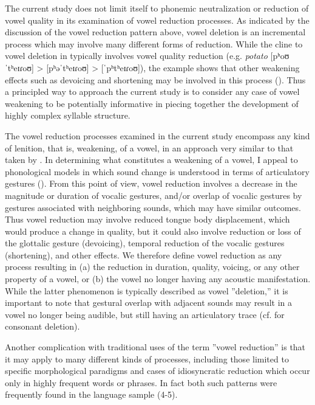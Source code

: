   The current study does not limit itself to phonemic neutralization or reduction of vowel quality in its examination of vowel reduction processes. As indicated by the discussion of the  vowel reduction pattern above, vowel deletion is an incremental process which may involve many different forms of reduction. While the cline to vowel deletion in  typically involves vowel quality reduction (e.g. \textit{potato} [pʰoʊˈtʰeɪɾoʊ] > [pʰəˈtʰeɪɾoʊ] > [ˈpʰtʰeɪɾoʊ]), the  example shows that other weakening effects such as devoicing and shortening may be involved in this process (\citealt{ChitoranBabaliyeva2007}). Thus a principled way to approach the current study is to consider any case of vowel weakening to be potentially informative in piecing together the development of highly complex syllable structure.

  The vowel reduction processes examined in the current study encompass any kind of lenition, that is, weakening, of a vowel, in an approach very similar to that taken by \citet{KapatsinskiEtAl2019}. In determining what constitutes a weakening of a vowel, I appeal to phonological models in which sound change is understood in terms of articulatory gestures (\citealt{BrowmanGoldstein1992b,MowreyPagliuca1995}). From this point of view, vowel reduction involves a decrease in the magnitude or duration of vocalic gestures, and/or overlap of vocalic gestures by gestures associated with neighboring sounds, which may have similar outcomes. Thus vowel reduction may involve reduced tongue body displacement, which would produce a change in quality, but it could also involve reduction or loss of the glottalic gesture (devoicing), temporal reduction of the vocalic gestures (shortening), and other effects. We therefore define vowel reduction as any process resulting in 
  (a) the reduction in duration, quality, voicing, or any other property of a vowel, or 
  (b) the vowel no longer having any acoustic manifestation. While the latter phenomenon is typically described as vowel ”deletion,” it is important to note that gestural overlap with adjacent sounds may result in a vowel no longer being audible, but still having an articulatory trace (cf. \citealt{BrowmanGoldstein1990} for consonant deletion).

  Another complication with traditional uses of the term ”vowel reduction” is that it may apply to many different kinds of processes, including those limited to specific morphological paradigms and cases of idiosyncratic reduction which occur only in highly frequent words or phrases. In fact both such patterns were frequently found in the language sample (4-5).

